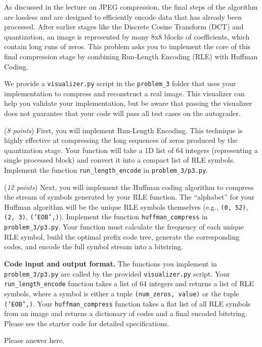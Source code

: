 \documentclass{hw_template}
\newcommand{\io}{\textbf{Code input and output format.} }
\begin{document}
\newpage
%
\begin{problem}
As discussed in the lecture on JPEG compression, the final steps of the algorithm are lossless and are designed to efficiently encode data that has already been processed. After earlier stages like the Discrete Cosine Transform (DCT) and quantization, an image is represented by many 8x8 blocks of coefficients, which contain long runs of zeros. This problem asks you to implement the core of this final compression stage by combining Run-Length Encoding (RLE) with Huffman Coding.

We provide a \texttt{visualizer.py} script in the \texttt{problem\_3} folder that uses your implementation to compress and reconstruct a real image. This visualizer can help you validate your implementation, but be aware that passing the visualizer does not guarantee that your code will pass all test cases on the autograder.

\begin{subproblem}
  (\textit{8 points})
  First, you will implement Run-Length Encoding. This technique is highly effective at compressing the long sequences of zeros produced by the quantization stage. Your function will take a 1D list of 64 integers (representing a single processed block) and convert it into a compact list of RLE symbols. Implement the function \texttt{run\_length\_encode} in \texttt{problem\_3/p3.py}.
\end{subproblem}

\begin{subproblem}
  (\textit{12 points})
  Next, you will implement the Huffman coding algorithm to compress the stream of symbols generated by your RLE function. The ``alphabet'' for your Huffman algorithm will be the unique RLE symbols themselves (e.g., \texttt{(0, 52)}, \texttt{(2, 3)}, \texttt{('EOB',)}). Implement the function \texttt{huffman\_compress} in \texttt{problem\_3/p3.py}. Your function must calculate the frequency of each unique RLE symbol, build the optimal prefix code tree, generate the corresponding codes, and encode the full symbol stream into a bitstring.
\end{subproblem}

\io The functions you implement in \texttt{problem\_3/p3.py} are called by the provided \texttt{visualizer.py} script. Your \texttt{run\_length\_encode} function takes a list of 64 integers and returns a list of RLE symbols, where a symbol is either a tuple \texttt{(num\_zeros, value)} or the tuple \texttt{('EOB',)}. Your \texttt{huffman\_compress} function takes a flat list of all RLE symbols from an image and returns a dictionary of codes and a final encoded bitstring. Please see the starter code for detailed specifications.
\end{problem}
\begin{solution}
    Please answer here.
\end{solution}
\newpage
\end{document}
